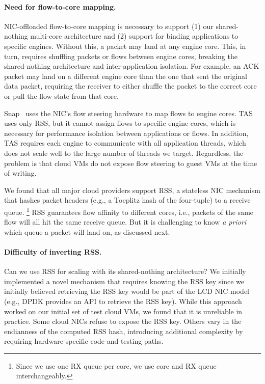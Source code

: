 \paragraph{Need for flow-to-core mapping.}
NIC-offloaded flow-to-core mapping is necessary to support (1) our shared-nothing multi-core architecture and (2) support for binding applications to specific engines.
Without this, a packet may land at any engine core.
This, in turn, requires shuffling packets or flows between engine cores, breaking the shared-nothing architecture and inter-application isolation.
For example, an ACK packet may land on a different engine core than the one that sent the original data packet, requiring the receiver to either shuffle the packet to the correct core or pull the flow state from that core.

Snap~\cite{snap} uses the NIC's flow steering hardware to map flows to engine cores.
TAS~\cite{tas} uses only RSS, but it cannot assign flows to specific engine cores, which is necessary for performance isolation between applications or flows.
In addition, TAS requires each engine to communicate with all application threads, which does not scale well to the large number of threads we target.
Regardless, the problem is that cloud VMs do not expose flow steering to guest VMs at the time of writing.

We found that all major cloud providers support RSS, a stateless NIC mechanism that hashes packet headers (e.g., a Toeplitz hash of the four-tuple) to a receive queue.
\footnote{Since we use one RX queue per core, we use core and RX queue interchangeably.}
RSS guarantees flow affinity to different cores, i.e., packets of the same flow will all hit the same receive queue.
But it is challenging to know {\it a priori} which queue a packet will land on, as discussed next.



\paragraph{Difficulty of inverting RSS.}
Can we use RSS for scaling \mt{} with its shared-nothing architecture?
We initially implemented a novel mechanism that requires knowing the RSS key since we initially believed retrieving the RSS key would be part of the LCD NIC model (e.g., DPDK provides an API to retrieve the RSS key).
While this approach worked on our initial set of test cloud VMs, we found that it is unreliable in practice.
Some cloud NICs refuse to expose the RSS key.
Others vary in the endianness of the computed RSS hash, introducing additional complexity by requiring hardware-specific code and testing paths.

